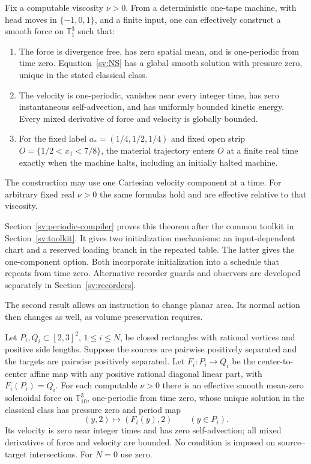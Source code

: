 \begin{theorem}\label{sv:periodic-theorem}
Fix a computable viscosity $\nu>0$.  From a deterministic one-tape
machine, with head moves in $\{-1,0,1\}$, and a finite input, one can
effectively construct a smooth force on $\mathbb T_1^3$ such that:
\begin{enumerate}[label=(\roman*),itemsep=2pt]
\item The force is divergence free, has zero spatial mean, and is
one-periodic from time zero.  Equation~\eqref{sv:NS} has a global
smooth solution with pressure zero, unique in the stated classical class.
\item The velocity is one-periodic, vanishes near every integer time,
has zero instantaneous self-advection, and has uniformly bounded kinetic
energy.  Every mixed derivative of force and velocity is globally bounded.
\item For the fixed label $a_*=(1/4,1/2,1/4)$ and fixed open strip
$O=\{1/2<x_1<7/8\}$, the material trajectory enters $O$ at a finite
real time exactly when the machine halts, including an initially halted
machine.
\end{enumerate}
The construction may use one Cartesian velocity component at a time.
For arbitrary fixed real $\nu>0$ the same formulas hold and are
effective relative to that viscosity.
\end{theorem}

Section~\ref{sv:periodic-compiler} proves this theorem after the
common toolkit in Section~\ref{sv:toolkit}. It gives two initialization
mechanisms: an input-dependent chart and a reserved loading branch in
the repeated table. The latter gives the one-component option. Both
incorporate initialization into a schedule that repeats from time zero.
Alternative recorder guards and observers are developed separately in
Section~\ref{sv:recorders}.

The second result allows an instruction to change planar area.  Its
normal action then changes as well, as volume preservation requires.

\begin{theorem}\label{sv:sheet-theorem}
Let $P_i,Q_i\subset[2,3]^2$, $1\le i\le N$, be closed rectangles
with rational vertices and positive side lengths.  Suppose the sources are pairwise
positively separated and the targets are pairwise positively separated.
Let $F_i:P_i\to Q_i$ be the center-to-center affine map with any
positive rational diagonal linear part, with $F_i(P_i)=Q_i$.  For each computable $\nu>0$
there is an effective smooth mean-zero solenoidal force on
$\mathbb T_{10}^3$, one-periodic from time zero, whose unique solution
in the classical class has pressure zero and period map
\[
 (y,2)\longmapsto(F_i(y),2)\qquad(y\in P_i).
\]
Its velocity is zero near integer times and has zero self-advection;
all mixed derivatives of force and velocity are bounded.  No condition
is imposed on source--target intersections.  For $N=0$ use zero.
\end{theorem}

